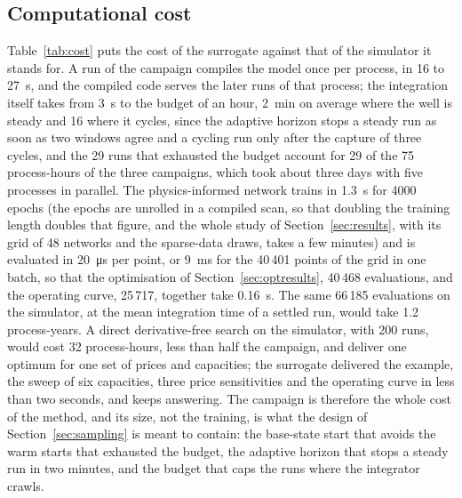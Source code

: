 \documentclass[a4paper,fleqn]{cas-sc}
\begin{document}
\subsection{Computational cost}\label{sec:cost}

Table~\ref{tab:cost} puts the cost of the surrogate against that of the simulator it stands for. A run of the campaign compiles the model once per process, in 16 to \SI{27}{\second}, and the compiled code serves the later runs of that process; the integration itself takes from \SI{3}{\second} to the budget of an hour, \SI{2}{\minute} on average where the well is steady and 16 where it cycles, since the adaptive horizon stops a steady run as soon as two windows agree and a cycling run only after the capture of three cycles, and the 29 runs that exhausted the budget account for 29 of the 75 process-hours of the three campaigns, which took about three days with five processes in parallel. The physics-informed network trains in \SI{1.3}{\second} for 4000 epochs (the epochs are unrolled in a compiled scan, so that doubling the training length doubles that figure, and the whole study of Section~\ref{sec:results}, with its grid of 48 networks and the sparse-data draws, takes a few minutes) and is evaluated in \SI{20}{\micro\second} per point, or \SI{9}{\milli\second} for the 40\,401 points of the grid in one batch, so that the optimisation of Section~\ref{sec:optresults}, 40\,468 evaluations, and the operating curve, 25\,717, together take \SI{0.16}{\second}. The same 66\,185 evaluations on the simulator, at the mean integration time of a settled run, would take 1.2 process-years. A direct derivative-free search on the simulator, with 200 runs, would cost 32 process-hours, less than half the campaign, and deliver one optimum for one set of prices and capacities; the surrogate delivered the example, the sweep of six capacities, three price sensitivities and the operating curve in less than two seconds, and keeps answering. The campaign is therefore the whole cost of the method, and its size, not the training, is what the design of Section~\ref{sec:sampling} is meant to contain: the base-state start that avoids the warm starts that exhausted the budget, the adaptive horizon that stops a steady run in two minutes, and the budget that caps the runs where the integrator crawls.

\begin{table}[htbp]
\caption{Computational cost of the campaign, of the surrogate and of the optimisation.}\label{tab:cost}
\footnotesize


\end{table}
\end{document}
